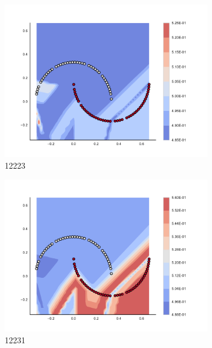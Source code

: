 \begin{figure}[h]
\begin{subfigure}[b]{0.09\textwidth}
    \includegraphics[clip, trim=2.35cm 1.75cm 4.5cm 0cm,width=\textwidth]{img/convergence/12223.pdf}
    \caption{12223}
    \label{fig:convergence_12223}
\end{subfigure}
%
\begin{subfigure}[b]{0.09\textwidth}
    \includegraphics[clip, trim=2.35cm 1.75cm 4.5cm 0cm,width=\textwidth]{img/convergence/12231.pdf}
    \caption{12231}
    \label{fig:convergence_12231}
\end{subfigure}
%
\begin{subfigure}[b]{0.09\textwidth}

\end{subfigure}
\end{figure}
